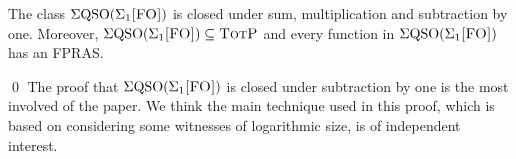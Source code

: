 \begin{thm}\label{sigmafo-minusone}
The class $\Sigma{\rm QSO}(\Sigma_{1}\textsc{[FO]})$ is closed under sum, multiplication and subtraction by one. Moreover, $\Sigma{\rm QSO}(\Sigma_{1}\textsc{[FO]}) \subseteq \text{\sc TotP}$ and every function in $\Sigma{\rm QSO}(\Sigma_{1}\textsc{[FO]})$ has an FPRAS.
\end{thm}
\proof

\qed
The proof that $\Sigma{\rm QSO}(\Sigma_{1}\textsc{[FO]})$ is closed under subtraction by one is the most involved of the paper. We think the main technique used in this proof, which is based on considering some witnesses of logarithmic size, is of independent interest.
